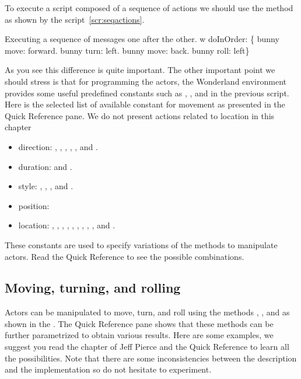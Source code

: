 To execute a script composed of a sequence of actions we should use the method
 as shown by the script~\ref{scr:seqactions}. 

\begin{scriptwithtitle}{Executing a sequence of messages one after the other.}\label{scr:seqactions}
w doInOrder: \{
   bunny move: forward.
   bunny turn: left.
   bunny move: back.
   bunny roll: left\}
\end{scriptwithtitle}

As you see this difference is quite important. The other important point 
we should stress is that  for programming the actors, the Wonderland environment provides some useful predefined constants such as , , and   in the previous script. Here is the selected list of available constant for movement as presented in the Quick Reference pane. We do not present actions related to location in this chapter

\begin{itemize}
\item direction: , , , , , and .
\item duration:  and .
\item style: , , , and .
\item position: 
\item location: , , , , , , ,
, , and .
\end{itemize}

These constants are used to specify variations of the methods to manipulate actors. 
Read the Quick Reference to see the possible combinations.

\subsection{Moving, turning, and rolling}
Actors can be manipulated to move, turn, and roll using the methods , , and  as shown in the . 
The Quick Reference pane shows that these methods can be further 
parametrized to obtain various results. Here are some examples, we suggest you read the chapter of Jeff Pierce and the Quick Reference to learn all the possibilities. 
Note that there are some inconsistencies between the description and the implementation so do not hesitate to experiment. 

